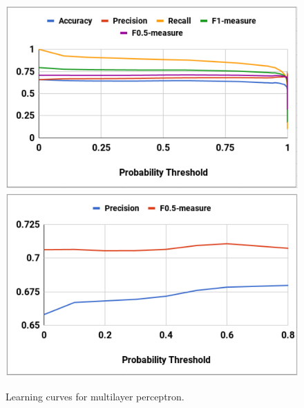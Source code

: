 \begin{figure}[H]
\centering
\includegraphics[scale=0.58]{figures/result_perceptron1.pdf}
\includegraphics[scale=0.58]{figures/result_perceptron2.pdf}
\caption{Learning curves for multilayer perceptron.}
\label{fig:learning curve of perceptron}
\end{figure}
